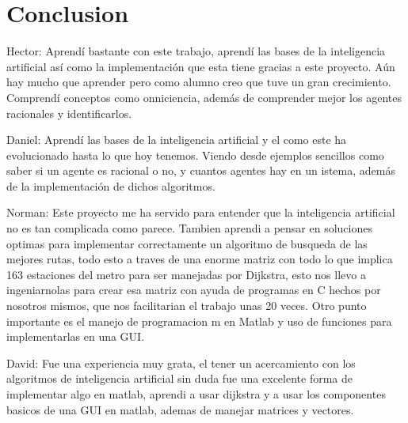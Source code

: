 \documentclass{article}
\begin{document}

\section{Conclusion}
Hector:
Aprendí bastante con este trabajo, aprendí las bases de la inteligencia artificial así como la implementación que esta tiene gracias a este proyecto. Aún hay mucho que aprender pero como alumno creo que tuve un gran crecimiento. Comprendí conceptos como onniciencia, además de comprender mejor los agentes racionales y identificarlos.

Daniel:
Aprendí las bases de la inteligencia artificial y el como este ha evolucionado hasta lo que hoy tenemos. Viendo desde ejemplos sencillos como saber si un agente es racional o no, y cuantos agentes hay en un istema, además de la implementación de dichos algoritmos.

Norman:
Este proyecto me ha servido para entender que la inteligencia artificial no es tan complicada como parece.
Tambien aprendi a pensar en soluciones optimas para implementar correctamente un algoritmo de busqueda de las mejores rutas, todo esto a traves de una enorme matriz con todo lo que implica 163 estaciones del metro para ser manejadas por Dijkstra, esto nos llevo a ingeniarnolas para crear esa matriz con ayuda de programas en C hechos por nosotros mismos, que nos facilitarian el trabajo unas 20 veces.
Otro punto importante es el manejo de programacion m en Matlab y uso de funciones para implementarlas en una GUI.

David: 
Fue una experiencia muy grata, el tener un acercamiento con los algoritmos de inteligencia artificial sin duda fue una excelente forma de implementar algo en matlab, aprendi a usar dijkstra y a usar los componentes basicos de una GUI en matlab, ademas de manejar matrices y vectores.
 \citep{}



\end{document}
